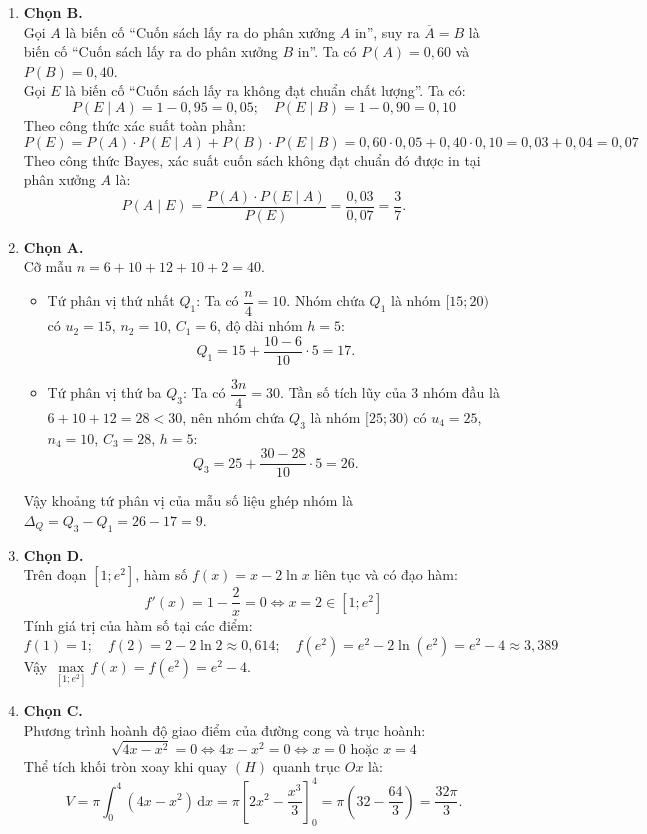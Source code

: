 \documentclass[12pt,a4paper]{article}
\begin{document}
\begin{enumerate}[label=\textbf{Câu \arabic*:}, leftmargin=*]
\item \textbf{Chọn B.}\\
Gọi $A$ là biến cố ``Cuốn sách lấy ra do phân xưởng $A$ in'', suy ra $\overline{A} = B$ là biến cố ``Cuốn sách lấy ra do phân xưởng $B$ in''. Ta có $P(A) = 0{,}60$ và $P(B) = 0{,}40$.\\
Gọi $E$ là biến cố ``Cuốn sách lấy ra không đạt chuẩn chất lượng''. Ta có:
$$P(E \mid A) = 1 - 0{,}95 = 0{,}05; \quad P(E \mid B) = 1 - 0{,}90 = 0{,}10$$
Theo công thức xác suất toàn phần:
$$P(E) = P(A)\cdot P(E \mid A) + P(B)\cdot P(E \mid B) = 0{,}60\cdot 0{,}05 + 0{,}40\cdot 0{,}10 = 0{,}03 + 0{,}04 = 0{,}07$$
Theo công thức Bayes, xác suất cuốn sách không đạt chuẩn đó được in tại phân xưởng $A$ là:
$$P(A \mid E) = \dfrac{P(A)\cdot P(E \mid A)}{P(E)} = \dfrac{0{,}03}{0{,}07} = \dfrac{3}{7}.$$

\item \textbf{Chọn A.}\\
Cỡ mẫu $n = 6 + 10 + 12 + 10 + 2 = 40$.
\begin{itemize}
    \item Tứ phân vị thứ nhất $Q_1$: Ta có $\dfrac{n}{4} = 10$. Nhóm chứa $Q_1$ là nhóm $[15; 20)$ có $u_2 = 15$, $n_2 = 10$, $C_1 = 6$, độ dài nhóm $h = 5$:
    $$Q_1 = 15 + \dfrac{10 - 6}{10}\cdot 5 = 17.$$
    \item Tứ phân vị thứ ba $Q_3$: Ta có $\dfrac{3n}{4} = 30$. Tần số tích lũy của $3$ nhóm đầu là $6 + 10 + 12 = 28 < 30$, nên nhóm chứa $Q_3$ là nhóm $[25; 30)$ có $u_4 = 25$, $n_4 = 10$, $C_3 = 28$, $h = 5$:
    $$Q_3 = 25 + \dfrac{30 - 28}{10}\cdot 5 = 26.$$
\end{itemize}
Vậy khoảng tứ phân vị của mẫu số liệu ghép nhóm là $\Delta_Q = Q_3 - Q_1 = 26 - 17 = 9$.

\item \textbf{Chọn D.}\\
Trên đoạn $[1; e^2]$, hàm số $f(x) = x - 2\ln x$ liên tục và có đạo hàm:
$$f'(x) = 1 - \dfrac{2}{x} = 0 \iff x = 2 \in [1; e^2]$$
Tính giá trị của hàm số tại các điểm:
$$f(1) = 1; \quad f(2) = 2 - 2\ln 2 \approx 0{,}614; \quad f(e^2) = e^2 - 2\ln(e^2) = e^2 - 4 \approx 3{,}389$$
Vậy $\max\limits_{[1; e^2]} f(x) = f(e^2) = e^2 - 4$.

\item \textbf{Chọn C.}\\
Phương trình hoành độ giao điểm của đường cong và trục hoành:
$$\sqrt{4x - x^2} = 0 \iff 4x - x^2 = 0 \iff x = 0 \text{ hoặc } x = 4$$
Thể tích khối tròn xoay khi quay $(H)$ quanh trục $Ox$ là:
$$V = \pi \int_{0}^{4} (4x - x^2)\,\mathrm{d}x = \pi \left[2x^2 - \dfrac{x^3}{3}\right]_{0}^{4} = \pi \left(32 - \dfrac{64}{3}\right) = \dfrac{32\pi}{3}.$$


\end{enumerate}
\end{document}
